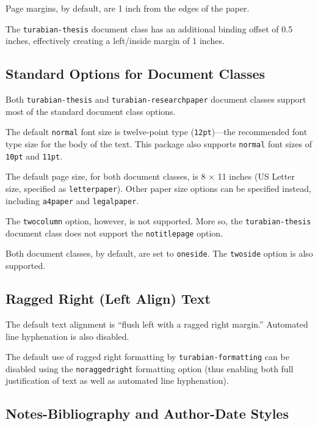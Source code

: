 \documentclass{article}
\begin{document}
Page margins, by default, are 1 inch from the edges of the paper.

The \texttt{turabian-thesis} document class has an additional binding offset of 0.5 inches, effectively creating a left/inside margin of 1 inches.


\subsection{Standard Options for Document Classes}

Both \texttt{turabian-thesis} and \texttt{turabian-researchpaper} document classes support most of the standard document class options.

The default \texttt{normal} font size is twelve-point type (\texttt{12pt})---the recommended font type size for the body of the text.\autocite[385]{turabian_manual_2018} This package also supports \texttt{normal} font sizes of \texttt{10pt} and \texttt{11pt}.

The default page size, for both document classes, is 8 × 11 inches (US Letter size, specified as \texttt{letterpaper}). Other paper size options can be specified instead, including \texttt{a4paper} and \texttt{legalpaper}.

The \texttt{twocolumn} option, however, is not supported. More so, the \texttt{turabian-thesis} document class does not support the \texttt{notitlepage} option.

Both document classes, by default, are set to \texttt{oneside}. The \texttt{twoside} option is also supported.

\clearpage
\subsection{Ragged Right (Left Align) Text}
\label{subsec:noraggedright}

The default text alignment is ``flush left with a ragged right margin.'' Automated line hyphenation is also disabled.\autocite[303, 416]{turabian_manual_2018}

%
The default use of ragged right formatting by \texttt{turabian-formatting} can be disabled using the \texttt{noraggedright} formatting option (thus enabling both full justification of text as well as automated line hyphenation).

\subsection{Notes-Bibliography and Author-Date Styles}
\end{document}
